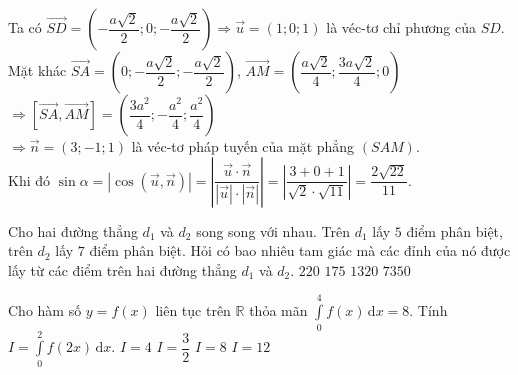 \begin{ex}
{{
}
\noindent Ta có $\vec{SD}=\left(-\dfrac{a\sqrt{2}}{2};0;-\dfrac{a\sqrt{2}}{2}\right)\Rightarrow \vec{u}=\left(1;0;1\right)$ là véc-tơ chỉ phương của $SD.$\\
Mặt khác $\vec{SA}=\left(0;-\dfrac{a\sqrt{2}}{2};-\dfrac{a\sqrt{2}}{2}\right)$, $\vec{AM}=\left(\dfrac{a\sqrt{2}}{4};\dfrac{3a\sqrt{2}}{4};0\right)$
$\Rightarrow \left[\vec{SA},\vec{AM}\right]=\left(\dfrac{3a^2}{4};-\dfrac{a^2}{4};\dfrac{a^2}{4}\right)$\\
$\Rightarrow \vec{n}=(3;-1;1)$ là véc-tơ pháp tuyến của mặt phẳng $(SAM).$\\
Khi đó $\sin\alpha=\left|\cos(\vec{u},\vec{n})\right|=\left|\dfrac{\vec{u}\cdot \vec{n}}{|\vec{u}|\cdot |\vec{n}|}\right|=\left|\dfrac{3+0+1}{\sqrt{2}\cdot \sqrt{11}}\right|=\dfrac{2\sqrt{22}}{11}.$
}
\end{ex}

\begin{ex}%
Cho hai đường thẳng $d_1$ và $d_2$ song song với nhau. Trên $d_1$ lấy $5$ điểm phân biệt, trên $d_2$ lấy $7$ điểm phân biệt. Hỏi có bao nhiêu tam giác mà các đỉnh của nó được lấy từ các điểm trên hai đường thẳng $d_1$ và $d_2.$
\choice
{$220$}
{\True $175$}
{$1320$}
{$7350$}
\end{ex}

\begin{ex}%
Cho hàm số $y=f(x)$ liên tục trên $\mathbb{R}$ thỏa mãn $\displaystyle\int\limits_{0}^{4}f(x)\mathrm{\,d}x=8.$ Tính $I=\displaystyle\int\limits_{0}^{2}f(2x)\mathrm{\,d}x.$
\choice
{\True $I=4$}
{$I=\dfrac{3}{2}$}
{$I=8$}
{$I=12$}
\end{ex}

